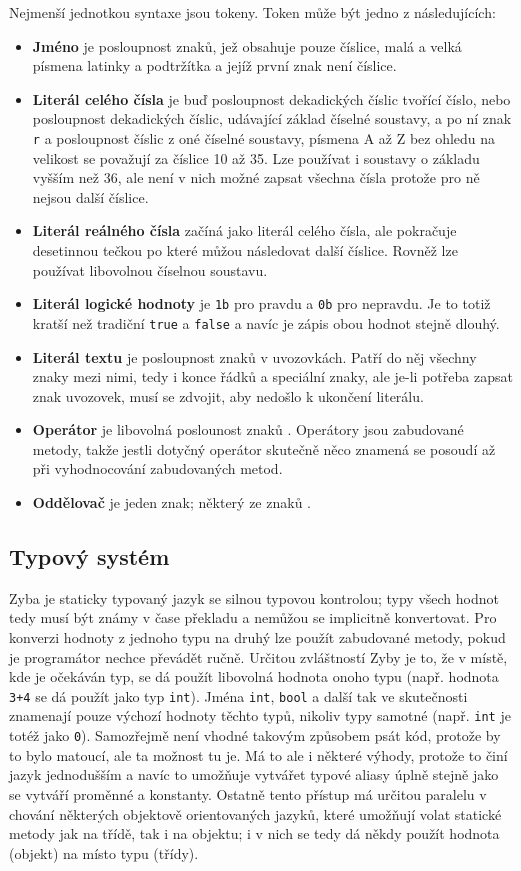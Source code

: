 \documentclass[a4paper,12pt]{article}
\def\circumflex{\char`\^}
\begin{document}
Nejmenší jednotkou syntaxe jsou tokeny. Token může být jedno z následujících:
\begin{itemize}
\item \textbf{Jméno} je posloupnost znaků, jež obsahuje pouze číslice, malá a velká písmena latinky a podtržítka a jejíž první znak není číslice.
\item \textbf{Literál celého čísla} je buď posloupnost dekadických číslic tvořící číslo, nebo posloupnost dekadických číslic, udávající základ číselné soustavy, a po ní znak \texttt{r} a posloupnost číslic z oné číselné soustavy, písmena A až Z bez ohledu na velikost se považují za číslice 10 až 35. Lze používat i soustavy o základu vyšším než 36, ale není v nich možné zapsat všechna čísla protože pro ně nejsou další číslice.
\item \textbf{Literál reálného čísla} začíná jako literál celého čísla, ale pokračuje desetinnou tečkou po které můžou následovat další číslice. Rovněž lze používat libovolnou číselnou soustavu.
\item \textbf{Literál logické hodnoty} je \texttt{1b} pro pravdu a \texttt{0b} pro nepravdu. Je to totiž kratší než tradiční \texttt{true} a \texttt{false} a navíc je zápis obou hodnot stejně dlouhý.
\item \textbf{Literál textu} je posloupnost znaků v uvozovkách. Patří do něj všechny znaky mezi nimi, tedy i konce řádků a speciální znaky, ale je-li potřeba zapsat znak uvozovek, musí se zdvojit, aby nedošlo k ukončení literálu.
\item \textbf{Operátor} je libovolná poslounost znaků \uv{\texttt{+-*/\%\&|\textasciitilde\circumflex<>=!}}. Operátory jsou zabudované metody, takže jestli dotyčný operátor skutečně něco znamená se posoudí až při vyhodnocování zabudovaných metod.
\item \textbf{Oddělovač} je jeden znak; některý ze znaků .
\end{itemize}

\subsection{Typový systém}
Zyba je staticky typovaný jazyk se silnou typovou kontrolou; typy všech hodnot tedy musí být známy v čase překladu a nemůžou se implicitně konvertovat. Pro konverzi hodnoty z jednoho typu na druhý lze použít zabudované metody, pokud je programátor nechce převádět ručně. Určitou zvláštností Zyby je to, že v místě, kde je očekáván typ, se dá použít libovolná hodnota onoho typu (např. hodnota \texttt{3+4} se dá použít jako typ \texttt{int}). Jména \texttt{int}, \texttt{bool} a další tak ve skutečnosti znamenají pouze výchozí hodnoty těchto typů, nikoliv typy samotné (např. \texttt{int} je totéž jako \texttt{0}). Samozřejmě není vhodné takovým způsobem psát kód, protože by to bylo matoucí, ale ta možnost tu je. Má to ale i některé výhody, protože to činí jazyk jednodušším a navíc to umožňuje vytvářet typové aliasy úplně stejně jako se vytváří proměnné a konstanty. Ostatně tento přístup má určitou paralelu v chování některých objektově orientovaných jazyků, které umožňují volat statické metody jak na třídě, tak i na objektu; i v nich se tedy dá někdy použít hodnota (objekt) na místo typu (třídy).
\end{document}
